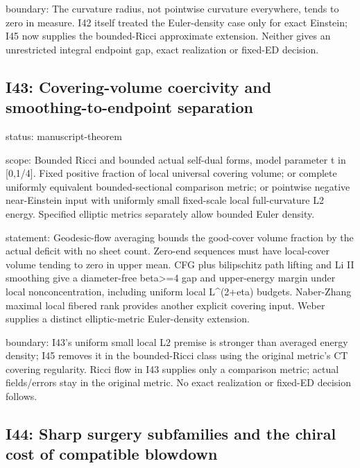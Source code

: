 \documentclass[
  10pt,
]{article}
\begin{document}
boundary: The curvature radius, not pointwise curvature everywhere,
tends to zero in measure. I42 itself treated the Euler-density case only
for exact Einstein; I45 now supplies the bounded-Ricci approximate
extension. Neither gives an unrestricted integral endpoint gap, exact
realization or fixed-ED decision.

\hypertarget{i43-covering-volume-coercivity-and-smoothing-to-endpoint-separation}{%
\subsection{I43: Covering-volume coercivity and smoothing-to-endpoint
separation}\label{i43-covering-volume-coercivity-and-smoothing-to-endpoint-separation}}

status: manuscript-theorem

scope: Bounded Ricci and bounded actual self-dual forms, model parameter
t in {[}0,1/4{]}. Fixed positive fraction of local universal covering
volume; or complete uniformly equivalent bounded-sectional comparison
metric; or pointwise negative near-Einstein input with uniformly small
fixed-scale local full-curvature L2 energy. Specified elliptic metrics
separately allow bounded Euler density.

statement: Geodesic-flow averaging bounds the good-cover volume fraction
by the actual deficit with no sheet count. Zero-end sequences must have
local-cover volume tending to zero in upper mean. CFG plus bilipschitz
path lifting and Li II smoothing give a diameter-free beta\textgreater=4
gap and upper-energy margin under local nonconcentration, including
uniform local L\^{}(2+eta) budgets. Naber-Zhang maximal local fibered
rank provides another explicit covering input. Weber supplies a distinct
elliptic-metric Euler-density extension.

boundary: I43's uniform small local L2 premise is stronger than averaged
energy density; I45 removes it in the bounded-Ricci class using the
original metric's CT covering regularity. Ricci flow in I43 supplies
only a comparison metric; actual fields/errors stay in the original
metric. No exact realization or fixed-ED decision follows.

\hypertarget{i44-sharp-surgery-subfamilies-and-the-chiral-cost-of-compatible-blowdown}{%
\subsection{I44: Sharp surgery subfamilies and the chiral cost of
compatible
blowdown}\label{i44-sharp-surgery-subfamilies-and-the-chiral-cost-of-compatible-blowdown}}
\end{document}
